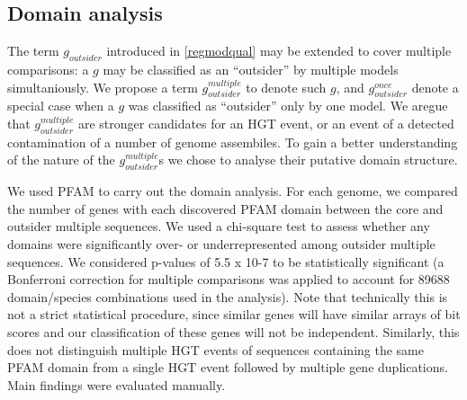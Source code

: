 \subsection{Domain analysis}
The term $g_{outsider}$ introduced in \ref{regmodqual} may be extended to
cover multiple comparisons: a $g$ may be classified as an ``outsider'' by
multiple models simultaniously. We propose a term $g_{outsider}^{multiple}$ to
denote such $g$, and $g_{outsider}^{once}$ denote a special case when a $g$ was
classified as ``outsider'' only by one model. We aregue that
$g_{outsider}^{multiple}$ are stronger candidates for an HGT event, or an event
of a detected contamination of a number of genome assembiles. To gain a better
understanding of the nature of the $g_{outsider}^{multiple}$s we chose to
analyse their putative domain structure.

We used PFAM \cite{Finn2014} to carry out the domain analysis. For each
genome, we compared the number of genes with each discovered PFAM domain
between the core and outsider multiple sequences. We used a chi-square test to
assess whether any domains were significantly over- or underrepresented among
outsider multiple sequences.  We considered p-values of 5.5 x 10-7 to be
statistically significant (a Bonferroni correction for multiple comparisons was
applied to account for 89688 domain/species combinations used in the analysis).
Note that technically this is not a strict statistical procedure, since similar
genes will have similar arrays of bit scores and our classification of these
genes will not be independent. Similarly, this does not distinguish multiple
HGT events of sequences containing the same PFAM domain from a single HGT event
followed by multiple gene duplications. Main findings were evaluated manually.
